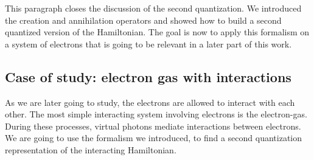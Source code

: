 \documentclass[../main.tex]{subfile}
\begin{document}
This paragraph closes the discussion of the second quantization. We introduced the creation and annihilation operators and showed how to build a 
second quantized version of the Hamiltonian. The goal is now to apply this formalism on a system of electrons that is going to be relevant in a later part of this work.


\subsection{Case of study: electron gas with interactions}
As we are later going to study, the electrons are allowed to interact with each other. The most simple interacting system involving electrons is the electron-gas.
During these processes, virtual photons mediate interactions between electrons. We are going to use the formalism we introduced, to 
find a second quantization representation of the interacting Hamiltonian.\\
\end{document}
